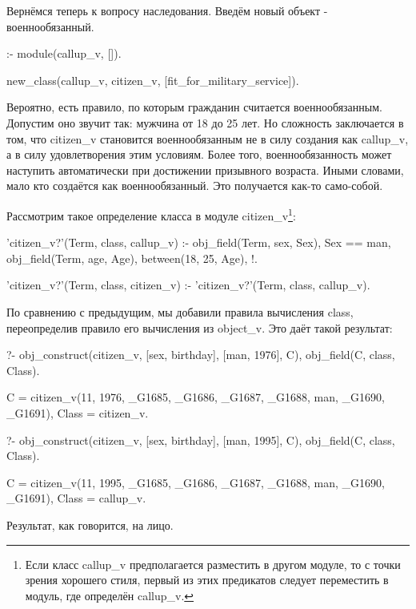 \documentclass[a4paper]{book}
\begin{document}
Вернёмся теперь к вопросу наследования. Введём новый объект -
военнообязанный.

\begin{example}{}{}
:- module(callup_v, []).

new_class(callup_v, citizen_v, [fit_for_military_service]).
\end{example}

Вероятно, есть правило, по которым гражданин считается
военнообязанным. Допустим оно звучит так: мужчина от 18 до 25
лет. Но сложность заключается в том, что citizen_v становится
военнообязанным не в силу создания как callup_v, а в силу
удовлетворения этим условиям. Более того, военнообязанность может
наступить автоматически при достижении призывного
возраста. Иными словами, мало кто создаётся как
военнообязанный. Это получается как-то само-собой.

Рассмотрим такое определение класса в модуле citizen_v\footnote{Если класс
  callup_v предполагается разместить в другом модуле, то с точки зрения
  хорошего стиля, первый из этих предикатов следует переместить в модуль, где
  определён callup_v.}:

\begin{example}{}{}
'citizen_v?'(Term, class, callup_v) :-
        obj_field(Term, sex, Sex),
        Sex == man,
        obj_field(Term, age, Age),
        between(18, 25, Age), !.

'citizen_v?'(Term, class, citizen_v) :-
        \+ 'citizen_v?'(Term, class, callup_v).
\end{example}


По сравнению с предыдущим, мы добавили правила вычисления class,
переопределив правило его вычисления из object_v. Это даёт такой
результат:

\begin{example}{}{}
?- obj_construct(citizen_v, [sex, birthday], [man, 1976], C), 
   obj_field(C, class, Class).

C = citizen_v(11, 1976, _G1685, _G1686, _G1687, _G1688, man, _G1690, _G1691),
Class = citizen_v.

?- obj_construct(citizen_v, [sex, birthday], [man, 1995], C), 
   obj_field(C, class, Class).

C = citizen_v(11, 1995, _G1685, _G1686, _G1687, _G1688, man, _G1690, _G1691),
Class = callup_v.
\end{example}

Результат, как говорится, на лицо.
\end{document}
